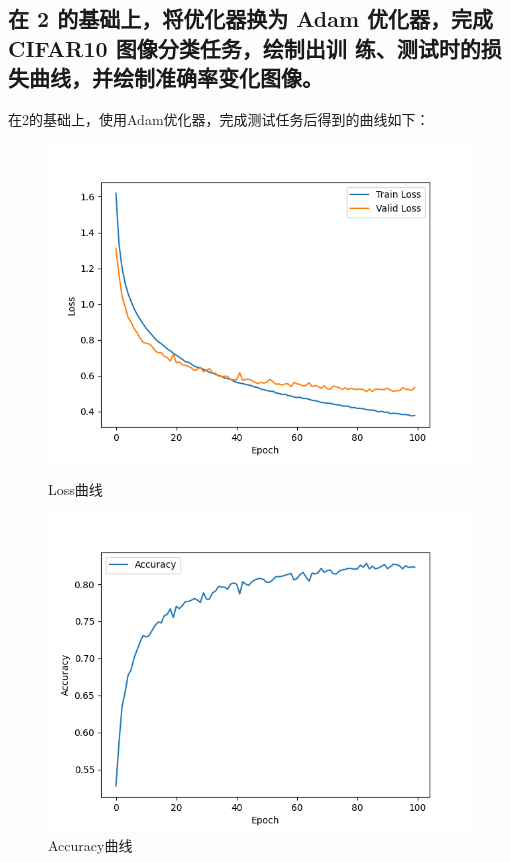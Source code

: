 \documentclass{article}%
\begin{document}
\subsection{在 2 的基础上，将优化器换为 Adam 优化器，完成 CIFAR10 图像分类任务，绘制出训
练、测试时的损失曲线，并绘制准确率变化图像。}
在2的基础上，使用Adam优化器，完成测试任务后得到的曲线如下：
\begin{figure}[H]
    \centering
    \begin{minipage}{0.49\linewidth}
        \centering
        \includegraphics[width=0.9\linewidth]{Loss_3.png}
        \caption{Loss曲线}
    \end{minipage}
    \begin{minipage}{0.49\linewidth}
        \centering
        \includegraphics[width=0.9\linewidth]{Acc_3.png}
        \caption{Accuracy曲线}
    \end{minipage}
\end{figure}
\end{document}
